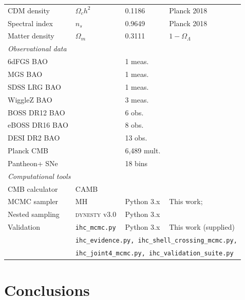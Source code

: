 \documentclass[12pt,a4paper]{article}
\begin{document}
\begin{longtable}{p{2.5cm}p{2.2cm}p{2.5cm}p{4.0cm}}
CDM density & $\Omega_c h^2$ & 0.1186 & Planck 2018 \\
Spectral index & $n_s$ & 0.9649 & Planck 2018 \\
Matter density & $\Omega_m$ & 0.3111 & $1-\Omega_\Lambda$ \\
\midrule
\multicolumn{4}{l}{\textit{Observational data}} \\
6dFGS BAO & & 1 meas.& \citet{Beutler2011} \\
MGS BAO & & 1 meas. & \citet{Ross2015} \\
SDSS LRG BAO & & 1 meas. & \citet{Padmanabhan2012} \\
WiggleZ BAO & & 3 meas. & \citet{Kazin2014} \\
BOSS DR12 BAO & & 6 obs. & \citet{Alam2017} \\
eBOSS DR16 BAO & & 8 obs. & \citet{Alam2021} \\
DESI DR2 BAO & & 13 obs. & \citet{DESI2025} \\
Planck CMB & & 6,489 mult. & \citet{Planck2020} \\
Pantheon+ SNe & & 18 bins & \citet{Pantheon2022} \\
\midrule
\multicolumn{4}{l}{\textit{Computational tools}} \\
CMB calculator & CAMB & & \citet{CAMB} \\
MCMC sampler & MH & Python 3.x & This work; \citet{RobertsRosenthal2001} \\
Nested sampling & \textsc{dynesty} v3.0 & Python 3.x & \citet{dynesty2020} \\
Validation & {\footnotesize\texttt{ihc\_mcmc.py}} & Python 3.x & This work (supplied) \\
 & \multicolumn{3}{l}{\scriptsize\texttt{ihc\_evidence.py, ihc\_shell\_crossing\_mcmc.py,}} \\
 & \multicolumn{3}{l}{\scriptsize\texttt{ihc\_joint4\_mcmc.py, ihc\_validation\_suite.py}} \\
\end{longtable}

\section{Conclusions}
\end{document}
